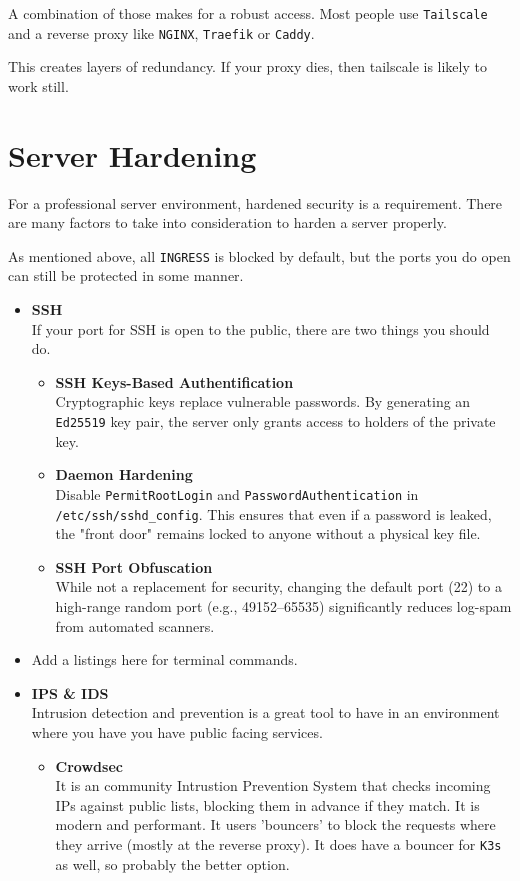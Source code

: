 A combination of those makes for a robust access. 
Most people use \texttt{Tailscale} and a reverse proxy like \texttt{NGINX}, \texttt{Traefik} or \texttt{Caddy}.

This creates layers of redundancy. If your proxy dies, then tailscale is likely to work still. 

\section{Server Hardening}
For a professional server environment, hardened security is a requirement. There are many factors to take into consideration to harden a server properly.

As mentioned above, all \texttt{INGRESS} is blocked by default, but the ports you do open can still be protected in some manner. 
\begin{itemize}
	\item \textbf{SSH} \\
	If your port for SSH is open to the public, there are two things you should do.
	\begin{itemize}
		\item \textbf{SSH Keys-Based Authentification} \\
		Cryptographic keys replace vulnerable passwords.
		By generating an \texttt{Ed25519} key pair, the server only grants access to holders of the private key.
		\item \textbf{Daemon Hardening} \\
		Disable \texttt{PermitRootLogin} and \texttt{PasswordAuthentication} in \texttt{/etc/ssh/sshd\_config}. This ensures that even if a password is leaked, the "front door" remains locked to anyone without a physical key file.
		\item \textbf{SSH Port Obfuscation} \\
		While not a replacement for security, changing the default port (22) to a high-range random port (e.g., 49152--65535) significantly reduces log-spam from automated scanners.
	\end{itemize}
	
	\item Add a listings here for terminal commands.
	
	\item \textbf{IPS \& IDS} \\
	Intrusion detection and prevention is a great tool to have in an environment where you have you have public facing services. 
	\begin{itemize}
		\item \textbf{Crowdsec} \\
		It is an community Intrustion Prevention System that checks incoming IPs against public lists, blocking them in advance if they match. It is modern and performant. It users 'bouncers' to block the requests where they arrive (mostly at the reverse proxy). It does have a bouncer for \texttt{K3s} as well, so probably the better option.
		

\end{itemize}
\end{itemize}
